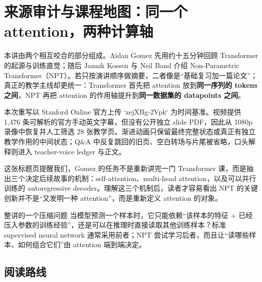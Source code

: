 \section{来源审计与课程地图：同一个 attention，两种计算轴}

本讲由两个相互咬合的部分组成。Aidan Gomez 先用约十五分钟回顾 Transformer 的起源与训练直觉；随后 Jannik Kossen 与 Neil Band 介绍 Non-Parametric Transformer（NPT）。若只按演讲顺序做摘要，二者像是“基础复习加一篇论文”；真正的教学主线却更统一：Transformer 首先把 attention 放到\textbf{同一序列的 tokens 之间}，NPT 再把 attention 的作用轴提升到\textbf{同一数据集的 datapoints 之间}。

本次重写以 Stanford Online 官方上传 `zejXBg-2Vpk` 为时间基准。视频提供 1,476 条可解析的官方手动英文字幕，但没有公开独立 slide PDF，因此从 1080p 录像中恢复并人工筛选 28 张教学页。渐进动画只保留最终完整状态或真正有独立教学作用的中间状态；Q\&A 中反复跳回的旧页、空白转场与片尾被省略，口头解释则进入 teacher-voice ledger 与正文。


这张标题页提醒我们，Gomez 的任务不是重新讲完一门 Transformer 课，而是抽出三个决定后续故事的机制：self-attention、multi-head attention，以及可以并行训练的 autoregressive decoder。理解这三个机制后，读者才容易看出 NPT 的关键创新并不是“又发明一种 attention”，而是重新定义 attention 的对象。


\begin{importantbox}{整讲的一个压缩问题}
当模型预测一个样本时，它只能依赖“该样本的特征 + 已经压入参数的训练经验”，还是可以在推理时直接读取其他训练样本？标准 supervised neural network 通常采用前者；NPT 尝试学习后者，而且让“读哪些样本、如何组合它们”由 attention 端到端决定。
\end{importantbox}


\subsection{阅读路线}

